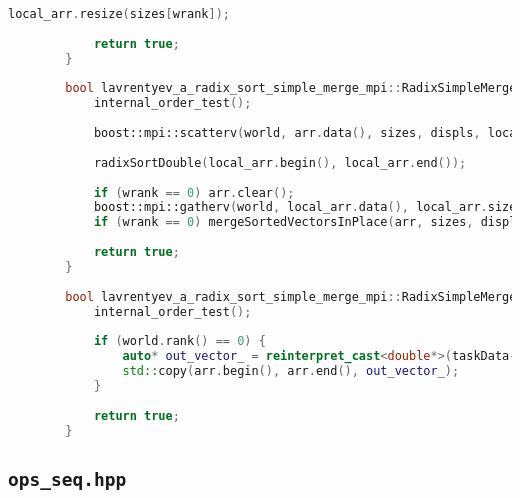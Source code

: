 \documentclass[12pt]{article}
\begin{document}
\begin{lstlisting}[language=C++]
			local_arr.resize(sizes[wrank]);
			
			return true;
		}
		
		bool lavrentyev_a_radix_sort_simple_merge_mpi::RadixSimpleMerge::run() {
			internal_order_test();
			
			boost::mpi::scatterv(world, arr.data(), sizes, displs, local_arr.data(), sizes[wrank], 0);
			
			radixSortDouble(local_arr.begin(), local_arr.end());
			
			if (wrank == 0) arr.clear();
			boost::mpi::gatherv(world, local_arr.data(), local_arr.size(), arr.data(), sizes, displs, 0);
			if (wrank == 0) mergeSortedVectorsInPlace(arr, sizes, displs);
			
			return true;
		}
		
		bool lavrentyev_a_radix_sort_simple_merge_mpi::RadixSimpleMerge::post_processing() {
			internal_order_test();
			
			if (world.rank() == 0) {
				auto* out_vector_ = reinterpret_cast<double*>(taskData->outputs[0]);
				std::copy(arr.begin(), arr.end(), out_vector_);
			}
			
			return true;
		}
	\end{lstlisting}
	
	\subsection*{\texttt{ops\_seq.hpp}}
	
\end{document}
